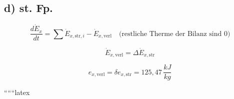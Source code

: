 \subsection*{d) st. Fp.}

\[
\frac{d\dot{E}_x}{dt} = \sum \dot{E}_{x,\text{str},i} - \dot{E}_{x,\text{verl}} \quad \text{(restliche Therme der Bilanz sind 0)}
\]

\[
\dot{E}_{x,\text{verl}} = \Delta \dot{E}_{x,\text{str}}
\]

\[
e_{x,\text{verl}} = \delta e_{x,\text{str}} = 125{,}47 \, \frac{kJ}{kg}
\]

``````latex